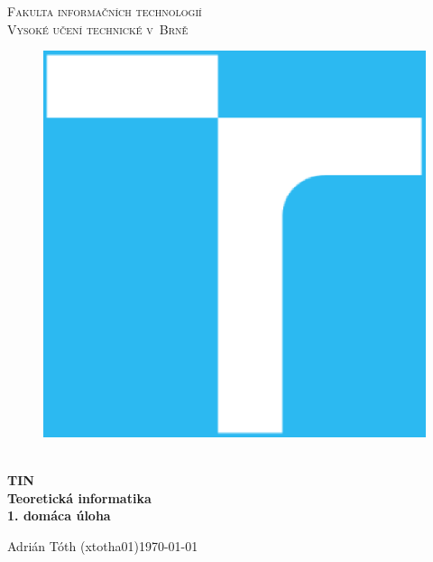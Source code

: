\documentclass[11pt,a4paper]{article}
\begin{document}
\begin{titlepage}
    \begin{center}
        \Huge
        \textsc{
            Fakulta informačních technologií\\
            Vysoké učení technické v~Brně
        }
        \vspace{80px}
        \begin{figure}[!h]
            \centering
            \includegraphics[scale=0.3]{img/vutbr-fit-logo.eps}
        \end{figure}
        \\[15mm]
        \Huge{
            \textbf{
                TIN
            }
        }
        \\[1.5mm]
        \huge{
            \textbf{
                Teoretická informatika
            }
        }
        \\[2.5em]
        \LARGE{
            \textbf{
                1. domáca úloha
            }
        }
        \vfill
    \end{center}
        \Large{
            Adrián Tóth (xtotha01)\hfill \today
        }
\end{titlepage}

\setlength{\parskip}{0pt}
\hypersetup{hidelinks}\tableofcontents
\setlength{\parskip}{0pt}
\end{document}
